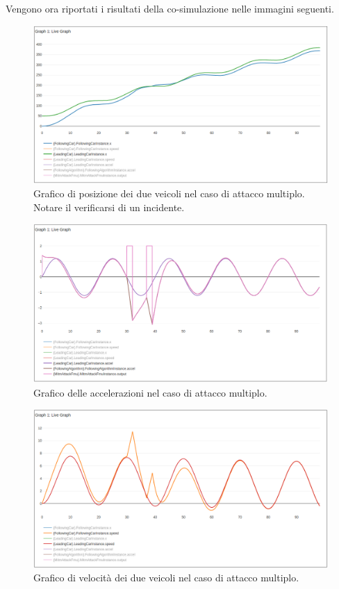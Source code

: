 Vengono ora riportati i risultati della co-simulazione nelle immagini seguenti.
\begin{figure}[H]
	\centering
	\includegraphics[width=\textwidth]{img/MultiAttackAccelPlotXCrash.png}
	\caption{Grafico di posizione dei due veicoli nel caso di attacco multiplo. Notare il verificarsi di un incidente.}
\end{figure}

\begin{figure}[H]
	\centering
	\includegraphics[width=\textwidth]{img/MultiAttackAccelPlotAccelCrash.png}
	\caption{Grafico delle accelerazioni nel caso di attacco multiplo.}
\end{figure}
\begin{figure}[H]
	\centering
	\includegraphics[width=\textwidth]{img/MultiAttackAccelPlotSpeedCrash.png}
	\caption{Grafico di velocità dei due veicoli nel caso di attacco multiplo.}
\end{figure}

